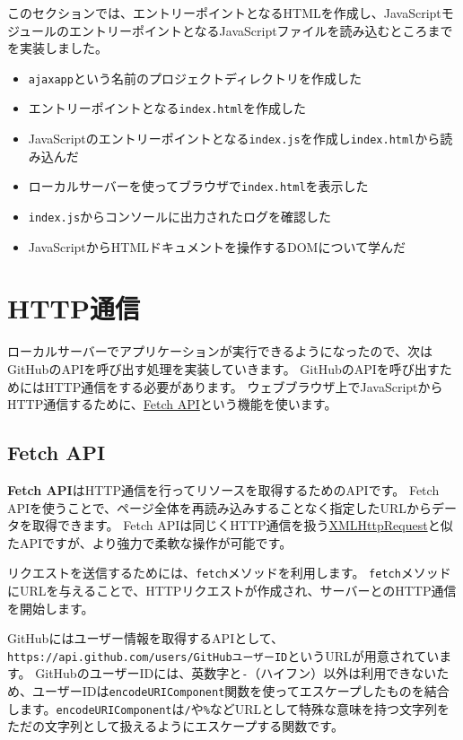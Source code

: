 このセクションでは、エントリーポイントとなるHTMLを作成し、JavaScriptモジュールのエントリーポイントとなるJavaScriptファイルを読み込むところまでを実装しました。

\begin{itemize}
\item
  \texttt{ajaxapp}という名前のプロジェクトディレクトリを作成した
\item
  エントリーポイントとなる\texttt{index.html}を作成した
\item
  JavaScriptのエントリーポイントとなる\texttt{index.js}を作成し\texttt{index.html}から読み込んだ
\item
  ローカルサーバーを使ってブラウザで\texttt{index.html}を表示した
\item
  \texttt{index.js}からコンソールに出力されたログを確認した
\item
  JavaScriptからHTMLドキュメントを操作するDOMについて学んだ
\end{itemize}

\hypertarget{http-communication}{%
\section{HTTP通信}\label{http-communication}}

ローカルサーバーでアプリケーションが実行できるようになったので、次はGitHubのAPIを呼び出す処理を実装していきます。
GitHubのAPIを呼び出すためにはHTTP通信をする必要があります。
ウェブブラウザ上でJavaScriptからHTTP通信するために、\href{https://developer.mozilla.org/ja/docs/Web/API/Fetch_API}{Fetch
API}という機能を使います。

\hypertarget{fetch-api}{%
\subsection{Fetch API}\label{fetch-api}}

\textbf{Fetch API}はHTTP通信を行ってリソースを取得するためのAPIです。
Fetch
APIを使うことで、ページ全体を再読み込みすることなく指定したURLからデータを取得できます。
Fetch
APIは同じくHTTP通信を扱う\href{https://developer.mozilla.org/ja/docs/Web/API/XMLHttpRequest}{XMLHttpRequest}と似たAPIですが、より強力で柔軟な操作が可能です。

リクエストを送信するためには、\texttt{fetch}メソッドを利用します。
\texttt{fetch}メソッドにURLを与えることで、HTTPリクエストが作成され、サーバーとのHTTP通信を開始します。

GitHubにはユーザー情報を取得するAPIとして、\texttt{https://api.github.com/users/GitHubユーザーID}というURLが用意されています。
GitHubのユーザーIDには、英数字と\texttt{-}（ハイフン）以外は利用できないため、ユーザーIDは\texttt{encodeURIComponent}関数を使ってエスケープしたものを結合します。\texttt{encodeURIComponent}は\texttt{/}や\texttt{\%}などURLとして特殊な意味を持つ文字列をただの文字列として扱えるようにエスケープする関数です。

